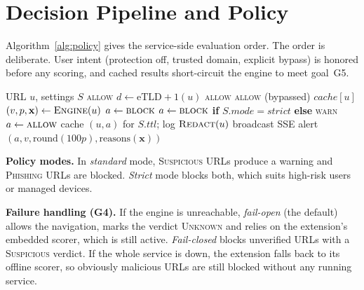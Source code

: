 \documentclass[conference]{IEEEtran}
\begin{document}
\section{Decision Pipeline and Policy}
\label{sec:policy}

Algorithm~\ref{alg:policy} gives the service-side evaluation order. The
order is deliberate. User intent (protection off, trusted domain, explicit
bypass) is honored before any scoring, and cached results short-circuit the
engine to meet goal~G5.

\begin{algorithm}[t]
\caption{Service-side URL evaluation}
\label{alg:policy}
\begin{algorithmic}[1]
\Require URL $u$, settings $S$
  \State \Return \textsc{allow}
\EndIf
\State $d \gets \mathrm{eTLD{+}1}(u)$
 \Return \textsc{allow} \EndIf
{} \Return \textsc{allow} (bypassed) \EndIf
{} \Return $\mathit{cache}[u]$ \EndIf
\State $(v,p,\mathbf{x}) \gets \textsc{Engine}(u)$ 
 $a \gets \textsc{block}$
  \State $a \gets \textsc{block}$ \textbf{if} $S.\mathit{mode}=\textit{strict}$ \textbf{else} \textsc{warn}
\Else\ $a \gets \textsc{allow}$
\EndIf
\State cache $(u,a)$ for $S.\mathit{ttl}$; log $\textsc{Redact}(u)$
 broadcast SSE alert \EndIf
\State \Return $(a, v, \mathrm{round}(100p), \mathrm{reasons}(\mathbf{x}))$
\end{algorithmic}
\end{algorithm}

\textbf{Policy modes.} In \emph{standard} mode, \textsc{Suspicious} URLs
produce a warning and \textsc{Phishing} URLs are blocked. \emph{Strict} mode
blocks both, which suits high-risk users or managed devices.

\textbf{Failure handling (G4).} If the engine is unreachable,
\emph{fail-open} (the default) allows the navigation, marks the verdict
\textsc{Unknown} and relies on the extension's embedded scorer, which is
still active. \emph{Fail-closed} blocks unverified URLs with a
\textsc{Suspicious} verdict. If the whole service is down, the extension
falls back to its offline scorer, so obviously malicious URLs are still
blocked without any running service.
\end{document}
